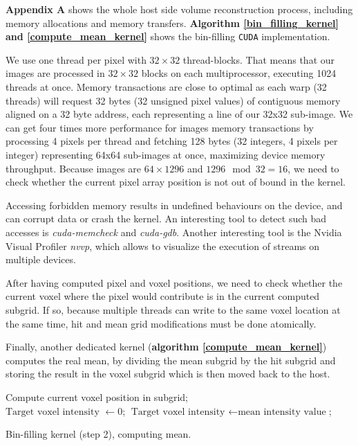 \documentclass[12pt,journal,compsoc]{IEEEtran}
\begin{document}
\newpage
\textbf{Appendix A} shows the whole host side volume reconstruction process, including memory allocations and memory transfers. 
\textbf{Algorithm \ref{bin_filling_kernel} and \ref{compute_mean_kernel}} shows the bin-filling \texttt{CUDA} implementation.

We use one thread per pixel with $32\times 32$ thread-blocks.
That means that our images are processed in $32\times 32$ blocks on each multiprocessor, executing 1024 threads at once.
Memory transactions are close to optimal as each warp (32 threads) will request 32 bytes (32 unsigned pixel values) of contiguous memory aligned on a 32 byte address, each representing a line of our 32x32 sub-image.
We can get four times more performance for images memory transactions by processing 4 pixels per thread and fetching 128 bytes (32 integers, 4 pixels per integer) representing 64x64 sub-images at once, maximizing device memory throughput.
Because images are $64\times 1296$ and $1296 \mod{32} = 16$, we need to check whether the current pixel array position is not out of bound in the kernel.


Accessing forbidden memory results in undefined behaviours on the device, and can corrupt data or crash the kernel.
An interesting tool to detect such bad accesses is \textit{cuda-memcheck} and \textit{cuda-gdb}.
Another interesting tool is the Nvidia Visual Profiler \textit{nvvp}, which allows to visualize the execution of streams on multiple devices.\par
After having computed pixel and voxel positions, we need to check whether the current voxel where the pixel would contribute is in the current computed subgrid. 
If so, because multiple threads can write to the same voxel location at the same time, hit and mean grid modifications must be done atomically.\par
Finally, another dedicated kernel (\textbf{algorithm \ref{compute_mean_kernel}}) computes the real mean, by dividing the mean subgrid by the hit subgrid and storing the result in the voxel subgrid which is then moved back to the host.


\begin{algorithm}
\vspace{0.2cm}
Compute current voxel position in subgrid;\\
%
{$\text{Target voxel intensity }\gets 0$;}%
{$\text{Target voxel intensity }\gets \text{mean intensity value}$;}

\caption{Bin-filling kernel (step 2), computing mean.}
\label{compute_mean_kernel}
\end{algorithm}
\end{document}
